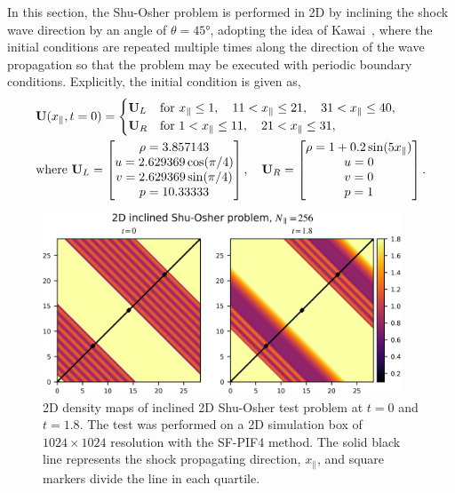 In this section, the Shu-Osher problem is performed in 2D by inclining the shock wave direction
by an angle of \(\theta = \ang{45} \),
adopting the idea of Kawai~\cite{kawai2013divergence},
where the initial conditions are repeated multiple times along the direction of the
wave propagation so that the problem may be executed with periodic boundary conditions.
Explicitly, the initial condition is given as,
\begin{equation}\label{eq:shu45_gov}
    \begin{split}
        &\mathbf{U}(x_{\parallel}, t=0) = \begin{cases}
            \mathbf{U}_{L} & \text{for } x_{\parallel} \le 1, \quad 11 < x_{\parallel} \le 21, \quad 31 < x_{\parallel} \le 40, \\
            \mathbf{U}_{R} & \text{for } 1 < x_{\parallel} \le 11, \quad 21 < x_{\parallel} \le 31,
        \end{cases}\\
        &\text{where } \mathbf{U}_{L} = \begin{bmatrix}
            \rho = 3.857143 \\
            u = 2.629369\cos(\pi/4) \\
            v = 2.629369\sin(\pi/4) \\
            p = 10.33333
        \end{bmatrix},\quad
        \mathbf{U}_{R} = \begin{bmatrix}
            \rho = 1 + 0.2\sin(5 x_{\parallel}) \\
            u = 0 \\
            v = 0 \\
            p = 1
        \end{bmatrix}.
    \end{split}
\end{equation}

\begin{figure}
    \centering
    \includegraphics[width=0.95\textwidth]{fig/shu45_2d_snapshot.png}
    \caption{2D density maps of inclined 2D Shu-Osher test problem
        at \( t=0 \) and \( t=1.8 \). The test was performed on a 2D simulation box
        of \(1024 \times 1024 \) resolution with the SF-PIF4 method.
        The solid black line represents the shock propagating direction, \( x_{\parallel} \),
        and square markers divide the line in each quartile.
    }\label{fig:shu45_cmap}
\end{figure}

